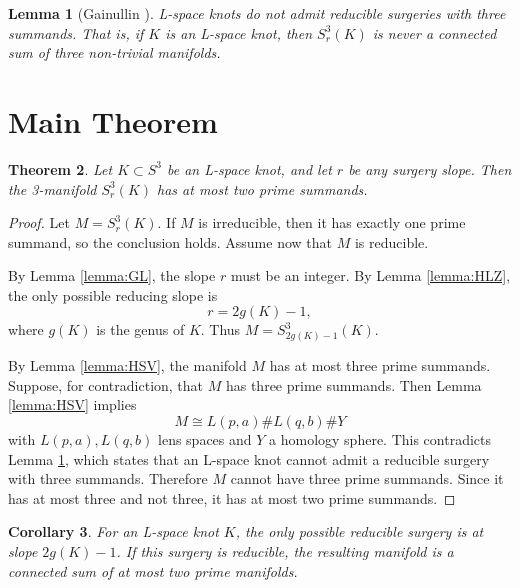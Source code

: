 \documentclass[11pt]{article}
\newtheorem{theorem}{Theorem}
\newtheorem{lemma}[theorem]{Lemma}
\newtheorem{corollary}[theorem]{Corollary}
\begin{document}
\begin{lemma}[Gainullin \cite{Gainullin}]
\label{lemma:Gainullin}
L-space knots do not admit reducible surgeries with three summands. That is, if \(K\) is an L-space knot, then \(S^3_r(K)\) is never a connected sum of three non-trivial manifolds.
\end{lemma}

\section{Main Theorem}

\begin{theorem}
\label{thm:main}
Let \(K \subset S^3\) be an L-space knot, and let \(r\) be any surgery slope. Then the 3-manifold \(S^3_r(K)\) has at most two prime summands.
\end{theorem}

\begin{proof}
Let \(M = S^3_r(K)\). If \(M\) is irreducible, then it has exactly one prime summand, so the conclusion holds. Assume now that \(M\) is reducible.

By Lemma \ref{lemma:GL}, the slope \(r\) must be an integer. By Lemma \ref{lemma:HLZ}, the only possible reducing slope is
\[
r = 2g(K) - 1,
\]
where \(g(K)\) is the genus of \(K\). Thus \(M = S^3_{2g(K)-1}(K)\).

By Lemma \ref{lemma:HSV}, the manifold \(M\) has at most three prime summands. Suppose, for contradiction, that \(M\) has three prime summands. Then Lemma \ref{lemma:HSV} implies
\[
M \cong L(p,a) \# L(q,b) \# Y
\]
with \(L(p,a), L(q,b)\) lens spaces and \(Y\) a homology sphere. This contradicts Lemma \ref{lemma:Gainullin}, which states that an L-space knot cannot admit a reducible surgery with three summands. Therefore \(M\) cannot have three prime summands. Since it has at most three and not three, it has at most two prime summands.
\end{proof}

\begin{corollary}
For an L-space knot \(K\), the only possible reducible surgery is at slope \(2g(K)-1\). If this surgery is reducible, the resulting manifold is a connected sum of at most two prime manifolds.
\end{corollary}
\end{document}

